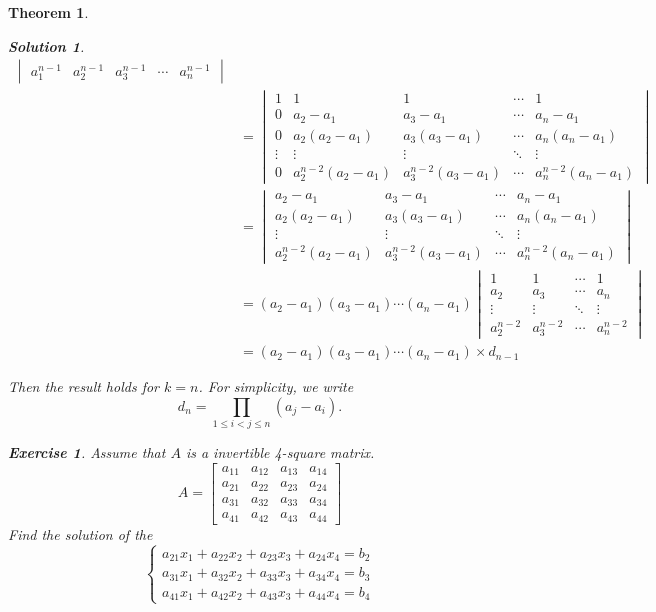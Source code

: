 \documentclass{article}
\newtheorem{theorem}{Theorem}[section]
\theoremstyle{definition}
\newtheorem{exercise}{Exercise}[section]
\newtheorem{solution}{Solution}[exercise]
\begin{document}
\begin{theorem}
\begin{solution}
\begin{align*}
\begin{vmatrix}
    a_{1}^{n-1} & a_{2}^{n-1} & a_{3}^{n-1} & \cdots & a_{n}^{n-1}
\end{vmatrix}\\
& =
\begin{vmatrix}
    1 & 1 & 1 & \cdots & 1 \\
    0 & a_{2}-a_{1} & a_{3}-a_{1} & \cdots & a_{n}-a_{1} \\
    0 & a_{2}(a_{2}-a_{1}) & a_{3}(a_{3}-a_{1}) & \cdots & a_{n}(a_{n}-a_{1}) \\
    \vdots & \vdots & \vdots & \ddots & \vdots \\
    0 & a_{2}^{n-2}(a_{2}-a_{1}) & a_{3}^{n-2}(a_{3}-a_{1}) & \cdots & a_{n}^{n-2}(a_{n}-a_{1})
\end{vmatrix}\\
& =
\begin{vmatrix}
    a_{2}-a_{1} & a_{3}-a_{1} & \cdots & a_{n}-a_{1} \\
    a_{2}(a_{2}-a_{1}) & a_{3}(a_{3}-a_{1}) & \cdots & a_{n}(a_{n}-a_{1}) \\
    \vdots & \vdots & \ddots & \vdots \\
    a_{2}^{n-2}(a_{2}-a_{1}) & a_{3}^{n-2}(a_{3}-a_{1}) & \cdots & a_{n}^{n-2}(a_{n}-a_{1})
\end{vmatrix}\\
& =
(a_{2}-a_{1})(a_{3}-a_{1})\cdots(a_{n}-a_{1})
\begin{vmatrix}
    1 & 1 & \cdots & 1 \\
    a_{2} & a_{3} & \cdots & a_{n} \\
    \vdots & \vdots & \ddots & \vdots \\
    a_{2}^{n-2} & a_{3}^{n-2} & \cdots & a_{n}^{n-2}
\end{vmatrix}\\
& =
(a_{2}-a_{1})(a_{3}-a_{1})\cdots(a_{n}-a_{1})\times d_{n-1}
\end{align*}

Then the result holds for $k=n$. For simplicity, we write 
$$d_{n}=\prod_{1\leq i<j\leq n}(a_{j}-a_{i}).$$
\end{solution}

\begin{exercise}
    Assume that $A$ is a invertible 4-square matrix.
    $$
    A=
    \begin{bmatrix}
        a_{11} & a_{12} & a_{13} & a_{14}\\
        a_{21} & a_{22} & a_{23} & a_{24}\\
        a_{31} & a_{32} & a_{33} & a_{34}\\
        a_{41} & a_{42} & a_{43} & a_{44}
    \end{bmatrix}
    $$
    Find the solution of the 
    $$
    \begin{cases}
        a_{21}x_{1}+a_{22}x_{2}+a_{23}x_{3}+a_{24}x_{4}=b_{2}\\
        a_{31}x_{1}+a_{32}x_{2}+a_{33}x_{3}+a_{34}x_{4}=b_{3}\\
        a_{41}x_{1}+a_{42}x_{2}+a_{43}x_{3}+a_{44}x_{4}=b_{4}
    \end{cases}
    $$
\end{exercise}


\end{theorem}
\end{document}
